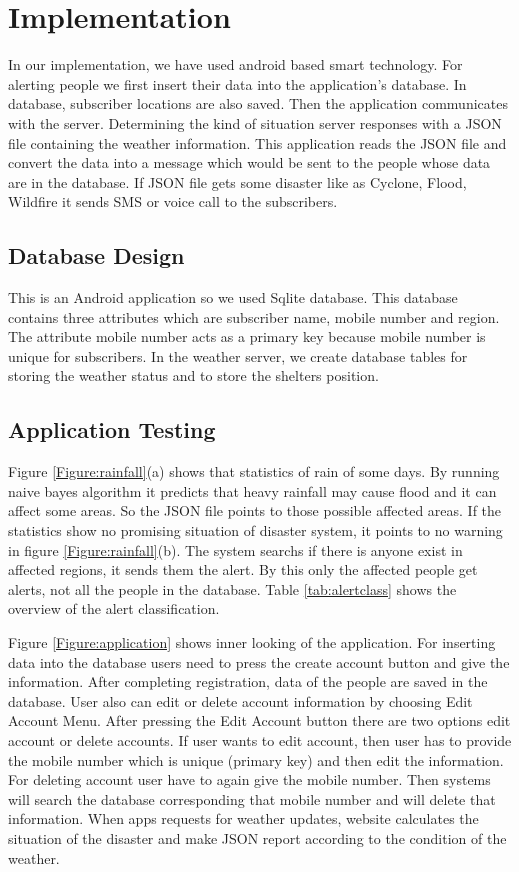 \documentclass[conference]{IEEEtran}
\begin{document}
\section {Implementation}
\label{implementation}

In our implementation, we have used android based smart technology. For alerting people we first insert their data into the application’s database. In database, subscriber locations are also saved. Then the application communicates with the server. Determining the kind of situation server responses with a JSON file containing the weather information. This application reads the JSON file and convert the data into a message which would be sent to the people whose data are in the database. If JSON file gets some disaster like as Cyclone, Flood, Wildfire it sends SMS or voice call to the subscribers.   


\subsection{Database Design}

This is an Android application so we used Sqlite database\cite{junyan2009application}. This database contains three attributes which are subscriber name, mobile number and region. The attribute mobile number acts as a primary key because mobile number is unique for subscribers.  In the weather server, we create database tables for storing the weather status and to store the shelters position. 

\subsection{Application Testing}

Figure \ref{Figure:rainfall}(a) shows that statistics of rain of some days. By running naive bayes algorithm it predicts that heavy rainfall may cause flood and it can affect some areas. So the JSON file points to those possible affected areas. If the statistics show no promising situation of disaster system, it points to no warning in figure \ref{Figure:rainfall}(b). The system searchs if there is anyone exist in affected regions, it sends them the alert. By this only the affected people get alerts, not all the people in the database. Table \ref{tab:alertclass} shows the overview of the alert classification.


Figure \ref{Figure:application} shows inner looking of the application. For inserting data into the database users need to press the create account button and give the information. After completing registration, data of the people are saved in the database. User also can edit or delete account information by choosing Edit Account Menu. After pressing the Edit Account button there are two options edit account or delete accounts. If user wants to edit account, then user has to provide the mobile number which is unique (primary key) and then edit the information. For deleting account user have to again give the mobile number. Then systems will search the database corresponding that mobile number and will delete that information. When apps requests for weather updates, website calculates the situation of the disaster and make JSON report according to the condition of the weather.
\end{document}
